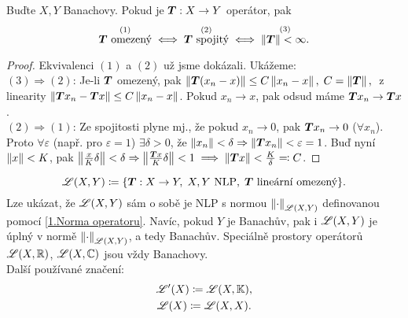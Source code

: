 \begin{lemma}
Buďte $X,Y$ Banachovy. Pokud je $\boldsymbol{T}: X \to Y$  operátor, pak
$$
    \overset{(1)}{\boldsymbol{T} \text{ omezený}}
    \iff
    \overset{(2)}{\boldsymbol{T} \text{ spojitý}}
    \iff
    \overset{(3)}{\left\lVert\boldsymbol{T}\right\rVert < \infty.}
$$
\end{lemma}
\begin{proof}
Ekvivalenci $(1)$ a $(2)$ už jsme dokázali. Ukážeme:
\\[5pt]
$(3) \Rightarrow (2)$: Je-li $\boldsymbol{T}$ omezený, pak $\left\lVert\boldsymbol{T} (x_n - x)\right\rVert \leq C \left\lVert x_n - x\right\rVert, \; C = \left\lVert\boldsymbol{T}\right\rVert, \;$ z linearity $\left\lVert\boldsymbol{T}x_n - \boldsymbol{T}x\right\rVert \leq C \left\lVert x_n - x\right\rVert$. Pokud $x_n \to x$, pak odsud máme $\boldsymbol{T}x_n \to \boldsymbol{T}x$.
\\[5pt]
$(2) \Rightarrow (1)$: Ze spojitosti plyne mj., že pokud $x_n \to 0$, pak $\boldsymbol{T}x_n \to 0$ ($\forall x_n$). Proto $\forall \varepsilon$ (např. pro $\varepsilon = 1$) $\exists \delta>0$, že $\left\lVert x_n\right\rVert < \delta \Rightarrow \left\lVert\boldsymbol{T}x_n\right\rVert < \varepsilon = 1$. Buď nyní $\left\lVert x\right\rVert < K$, pak $\left\lVert\frac{x}{K} \delta\right\rVert < \delta \Rightarrow \left\lVert\frac{\boldsymbol{T}x}{K} \delta\right\rVert < 1 \implies \left\lVert\boldsymbol{T}x\right\rVert < \frac{K}{\delta} \eqqcolon C$.
\end{proof}

\begin{definition}

$$
    \mathscr{L}(X, Y)
    \coloneqq
    \{
        \boldsymbol{T}: X \to Y, \;
        X,Y \text{ NLP}, \;
        \boldsymbol{T} \text{ lineární omezený}
    \}.
$$
Lze ukázat, že $\mathscr{L}(X, Y)$ sám o sobě je NLP s normou $\left\lVert\cdot\right\rVert_{\mathscr{L}(X,Y)}$ definovanou pomocí \ref{1.Norma operatoru}. Navíc, pokud $Y$ je Banachův, pak i $\mathscr{L}(X, Y)$ je úplný v normě $\left\lVert\cdot\right\rVert_{\mathscr{L}(X,Y)}$, a tedy Banachův. Speciálně prostory operátorů $\mathscr{L}(X, \mathbb{R})$, $\mathscr{L}(X, \mathbb{C})$ jsou vždy Banachovy.
\\
Další používané značení:
\begin{gather*}
    \mathscr{L}'(X) \coloneqq \mathscr{L}(X, \mathbb{K}), \\
    \mathscr{L}(X) \coloneqq \mathscr{L}(X, X).
\end{gather*}
\end{definition}

